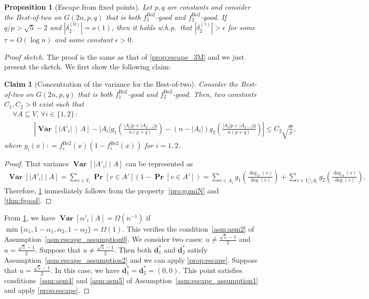 \documentclass[letterpaper,11pt]{article}
\newtheorem{proposition}[theorem]{Proposition}
\newtheorem{claim}[theorem]{Claim}
\newcommand{\Btwo}{\mathrm{Bo2}}
\renewcommand\Pr{\mathop{\mathbf{Pr}}}
\newcommand{\Var}{\mathop{\mathbf{Var}}}%
\def\defeq{\mathrel{\mathop:}=}%
\begin{document}
%
\begin{proposition}[Escape from fixed points] \label{prop:escape_2C}
Let $p,q$ are constants and consider the Best-of-two on $G(2n,p,q)$ that is both $f^{\Btwo}_1$-good and $f^{\Btwo}_2$-good.
If $q/p>\sqrt{5}-2$ and $|\delta_2^{(0)}|=o(1)$, then it holds w.h.p.~that $|\delta_2^{(\tau)}|>\epsilon$ for some $\tau=O(\log n)$ and some constant $\epsilon>0$.
\end{proposition}
%
\begin{proof}[Proof sketch]
The proof is the same as that of \cref{prop:escape_3M} and we just present the sketch.
We first show the following claim:
\begin{claim}[Concentration of the variance for the Best-of-two]  \label{claim:mainthm_Var_2C}
Consider the Best-of-two on $G(2n,p,q)$ that is both $f^{\Btwo}_1$-good and $f^{\Btwo}_2$-good.
Then, two constants $C_1,C_2>0$ exist such that
\begin{align*}
&\forall A\subseteq V, \, \forall i\in\{1,2\}\,: \\
&\hspace{3em}
\left|\Var\left[|A'_i|\,\middle|\, A \right]
-
|A_i| g_1\left(\frac{|A_i|p+|A_{3-i}|q}{n(p+q)}\right) - (n-|A_i|) g_2\left(\frac{|A_i|p+|A_{3-i}|q}{n(p+q)}\right)
\right| \leq C_2\sqrt{\frac{n}{p}},
\end{align*}
where $g_i(x)\defeq f^{\Btwo}_i(x)(1-f^{\Btwo}_i(x))$ for $i=1,2$.
\end{claim}
%
\begin{proof}
That variance $\Var[|A'_i| \mid A]$ can be represented as
\begin{align*}
\Var[|A'_i| \mid A]
= \sum_{v\in V_i} \Pr[v\in A'](1-\Pr[v\in A'])
= \sum_{v\in A_i} g_1\left(\frac{\deg_A(v)}{\deg(v)}\right) 
+ \sum_{v\in V_i\setminus A_i} g_2\left(\frac{\deg_A(v)}{\deg(v)}\right).
\end{align*}
Therefore, \cref{claim:mainthm_Var_2C} immediately follows from the property~\ref{pro:gomiN} and \cref{thm:fgood}.
\end{proof}

From \cref{claim:mainthm_Var_2C}, we have $\Var[\alpha'_i\mid A]=\Omega(n^{-1})$ if $\min\{\alpha_1,1-\alpha_1,\alpha_2,1-\alpha_2\}=\Omega(1)$.
This verifies the condition~\ref{asm:asm2} of Assumption~\ref{asm:escape_assumption0}.
We consider two cases: $u\neq \frac{\sqrt{5}-1}{2}$ and $u=\frac{\sqrt{5}-1}{2}$.
Suppose that $u\neq\frac{\sqrt{5}-1}{2}$.
Then both $\mathbf{d}^*_1$ and $\mathbf{d}^*_2$ satisfy Assumption~\ref{asm:escape_assumption2} and we can apply \cref{prop:escape}.
Suppose that  $u=\frac{\sqrt{5}-1}{2}$.
In this case, we have $\mathbf{d}^*_1=\mathbf{d}^*_2=(0,0)$.
This point satisfies conditions~\ref{asm:asm4} and \ref{asm:asm5} of Assumption~\ref{asm:escape_assumption1} and apply \cref{prop:escape}.
\end{proof}
\end{document}

